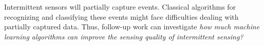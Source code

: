 Intermittent sensors will partially capture events. Classical algorithms for recognizing and classifying these events might face difficulties  dealing with partially captured data. Thus, follow-up work can investigate \emph{how much machine learning algorithms can improve the sensing quality of intermittent sensing?} 




